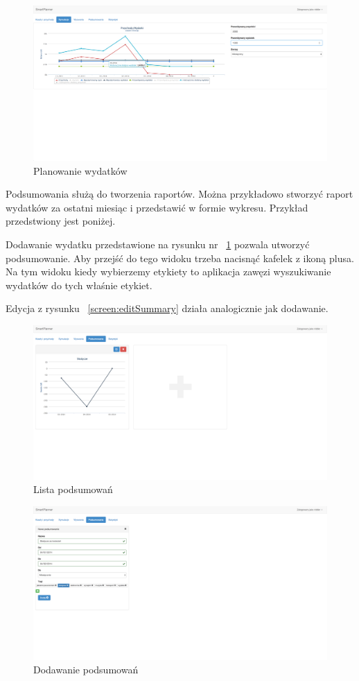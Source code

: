 \documentclass[10pt,titlepage]{article}
\begin{document}
\begin{figure}[H]
  \centering
  \includegraphics[scale=0.2]{images/screen_planowanieWydatkow.png}
  \caption{Planowanie wydatków}
\end{figure}
\par Podsumowania służą do tworzenia raportów. Można przykładowo stworzyć raport wydatków za ostatni miesiąc i przedstawić w formie wykresu. Przykład przedstwiony jest poniżej.
\par Dodawanie wydatku przedstawione na rysunku nr ~\ref{screen:addSummary} pozwala utworzyć podsumowanie. Aby przejść do tego widoku trzeba nacisnąć kafelek z ikoną plusa. Na tym widoku kiedy wybierzemy etykiety to aplikacja zawęzi wyszukiwanie wydatków do tych właśnie etykiet.
\par Edycja z rysunku ~\ref{screen:editSummary} działa analogicznie jak dodawanie.
\begin{figure}[H]
  \centering
  \includegraphics[scale=0.2]{images/screen_podsumowania.png}
  \caption{Lista podsumowań}
\end{figure}
\begin{figure}[H]
  \centering
  \includegraphics[scale=0.2]{images/screen_podsumowaniaDodaj.png}
  \caption{Dodawanie podsumowań}
  \label{screen:addSummary}
\end{figure}
\end{document}

